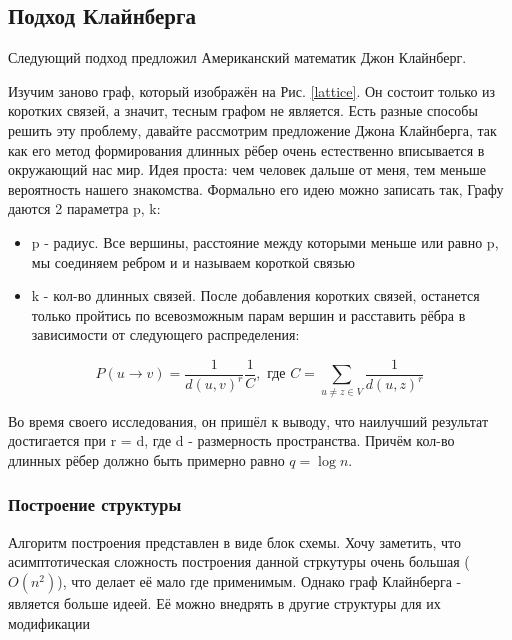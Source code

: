 \subsection{Подход Клайнберга}

    Следующий подход предложил Американский математик Джон Клайнберг. \cite{Kleinberg, Kleinberg2}

    Изучим заново граф, который изображён на Рис. \ref{lattice}. Он состоит только из
коротких связей, а значит, тесным графом не является. Есть разные способы решить эту проблему,
давайте рассмотрим предложение Джона Клайнберга, так как его метод формирования длинных
рёбер очень естественно вписывается в окружающий нас мир. Идея проста: чем человек дальше от меня, тем меньше
вероятность нашего знакомства. Формально его идею можно записать так, 
Графу даются 2 параметра p, k:
\begin{itemize}
    \item p - радиус. Все вершины, расстояние между которыми меньше или равно p, мы соединяем ребром и 
    и называем короткой связью
    \item k - кол-во длинных связей. После добавления коротких связей, останется только пройтись по всевозможным 
    парам вершин и расставить рёбра в зависимости от следующего распределения:
\end{itemize}

\begin{equation} \label{edges_distribution}
    P(u \rightarrow v) = \frac{1}{d(u, v)^r}\frac{1}{C}, \text{ где } C = \sum_{u \neq z \in V}\frac{1}{d(u, z)^r}
\end{equation}

Во время своего исследования, он пришёл к выводу, что наилучший результат дости\-гается при 
r = d, где d - размерность пространства. Причём кол-во длинных рёбер должно быть 
примерно равно $q = \log{n}$.

\subsubsection{Построение структуры}
Алгоритм построения представлен в виде блок схемы. Хочу заметить, что асимптоти\-ческая
сложность построения данной стркутуры очень большая ($O(n^2)$), что делает её мало где применимым.
Однако граф Клайнберга - является больше идеей. Её можно внедрять в другие структуры для 
их модификации 

